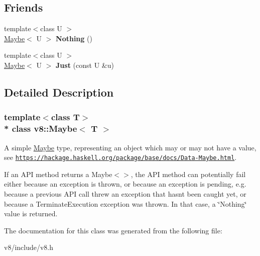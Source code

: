 \subsection*{Friends}
\begin{DoxyCompactItemize}
\item 
{\footnotesize template$<$class U $>$ }\\\hyperlink{classv8_1_1Maybe}{Maybe}$<$ U $>$ {\bfseries Nothing} ()\hypertarget{classv8_1_1Maybe_aeb9593e125b42d748acbd69b72c89f37}{}\label{classv8_1_1Maybe_aeb9593e125b42d748acbd69b72c89f37}

\item 
{\footnotesize template$<$class U $>$ }\\\hyperlink{classv8_1_1Maybe}{Maybe}$<$ U $>$ {\bfseries Just} (const U \&u)\hypertarget{classv8_1_1Maybe_aeff0e7fedd63cfebe9a5286e2cd8552d}{}\label{classv8_1_1Maybe_aeff0e7fedd63cfebe9a5286e2cd8552d}

\end{DoxyCompactItemize}


\subsection{Detailed Description}
\subsubsection*{template$<$class T$>$\\*
class v8\+::\+Maybe$<$ T $>$}

A simple \hyperlink{classv8_1_1Maybe}{Maybe} type, representing an object which may or may not have a value, see \href{https://hackage.haskell.org/package/base/docs/Data-Maybe.html}{\tt https\+://hackage.\+haskell.\+org/package/base/docs/\+Data-\/\+Maybe.\+html}.

If an A\+PI method returns a Maybe$<$$>$, the A\+PI method can potentially fail either because an exception is thrown, or because an exception is pending, e.\+g. because a previous A\+PI call threw an exception that hasn\textquotesingle{}t been caught yet, or because a Terminate\+Execution exception was thrown. In that case, a \char`\"{}\+Nothing\char`\"{} value is returned. 

The documentation for this class was generated from the following file\+:\begin{DoxyCompactItemize}
\item 
v8/include/v8.\+h\end{DoxyCompactItemize}

